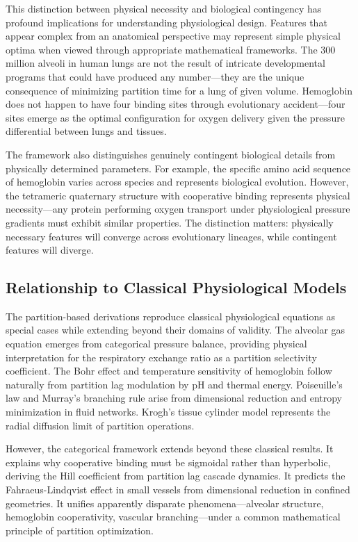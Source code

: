 \documentclass[12pt,a4paper]{article}
\theoremstyle{remark}
\begin{document}
This distinction between physical necessity and biological contingency has profound implications for understanding physiological design. Features that appear complex from an anatomical perspective may represent simple physical optima when viewed through appropriate mathematical frameworks. The 300 million alveoli in human lungs are not the result of intricate developmental programs that could have produced any number—they are the unique consequence of minimizing partition time for a lung of given volume. Hemoglobin does not happen to have four binding sites through evolutionary accident—four sites emerge as the optimal configuration for oxygen delivery given the pressure differential between lungs and tissues.

The framework also distinguishes genuinely contingent biological details from physically determined parameters. For example, the specific amino acid sequence of hemoglobin varies across species and represents biological evolution. However, the tetrameric quaternary structure with cooperative binding represents physical necessity—any protein performing oxygen transport under physiological pressure gradients must exhibit similar properties. The distinction matters: physically necessary features will converge across evolutionary lineages, while contingent features will diverge.

\subsection{Relationship to Classical Physiological Models}

The partition-based derivations reproduce classical physiological equations as special cases while extending beyond their domains of validity. The alveolar gas equation emerges from categorical pressure balance, providing physical interpretation for the respiratory exchange ratio as a partition selectivity coefficient. The Bohr effect and temperature sensitivity of hemoglobin follow naturally from partition lag modulation by pH and thermal energy. Poiseuille's law and Murray's branching rule arise from dimensional reduction and entropy minimization in fluid networks. Krogh's tissue cylinder model represents the radial diffusion limit of partition operations.

However, the categorical framework extends beyond these classical results. It explains why cooperative binding must be sigmoidal rather than hyperbolic, deriving the Hill coefficient from partition lag cascade dynamics. It predicts the Fahraeus-Lindqvist effect in small vessels from dimensional reduction in confined geometries. It unifies apparently disparate phenomena—alveolar structure, hemoglobin cooperativity, vascular branching—under a common mathematical principle of partition optimization.
\end{document}
